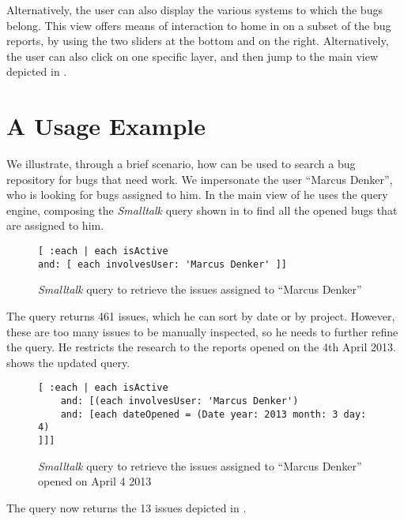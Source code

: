 Alternatively, the user can also display the various systems to which the bugs belong. This view offers means of interaction to home in on a subset of the bug reports, by using the two sliders at the bottom and on the right. Alternatively, the user can also click on one specific layer, and then jump to the main view depicted in .



\section{A Usage Example}

We illustrate, through a brief scenario, how \ib can be used to search a bug repository for bugs that need work. We impersonate the user ``Marcus Denker'', who is looking for bugs assigned to him. In the main view of \ib he uses the query engine, composing the \textit{Smalltalk} query shown in  to find all the opened bugs that are assigned to him.

\begin{figure}[ht]
{\scriptsize
\begin{verbatim}
[ :each | each isActive
and: [ each involvesUser: 'Marcus Denker' ]]
\end{verbatim}
}
\caption{\emph{Smalltalk} query to retrieve the issues assigned to ``Marcus Denker''}
\label{smalltalk-query-one}
\end{figure}

The query returns 461 issues, which he can sort by date or by project. However, these are too many issues to be manually inspected, so he needs to further refine the query. He restricts the research to the reports opened on the 4th April 2013.  shows the updated query.

\begin{figure}[ht]
{\scriptsize
\begin{verbatim}
[ :each | each isActive
	and: [(each involvesUser: 'Marcus Denker')
	and: [each dateOpened = (Date year: 2013 month: 3 day: 4)
]]]
\end{verbatim}
}
\caption{{\em Smalltalk} query to retrieve the issues assigned to ``Marcus Denker'' opened on April 4 2013}
\label{smalltalk-query-two}
\end{figure}

The query now returns the 13 issues depicted in .

